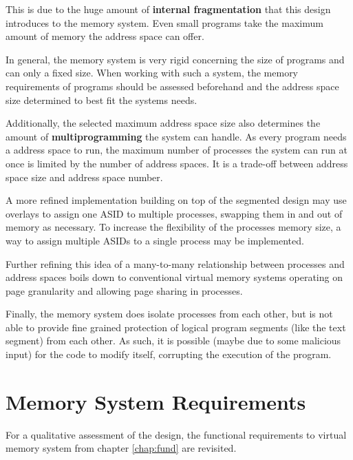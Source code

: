This is due to the huge amount of \textbf{internal fragmentation} that this design introduces to the memory system. Even small programs take the maximum amount of memory the address space can offer.

In general, the memory system is very rigid concerning the size of programs and can only a fixed size. When working with such a system, the memory requirements of programs should be assessed beforehand and the address space size determined to best fit the systems needs.

Additionally, the selected maximum address space size also determines the amount of \textbf{multiprogramming} the system can handle. As every program needs a address space to run, the maximum number of processes the system can run at once is limited by the number of address spaces.
It is a trade-off between address space size and address space number.

A more refined implementation building on top of the segmented design may use overlays \cite{tanenbaumOS} to assign one ASID to multiple processes, swapping them in and out of memory as necessary. To increase the flexibility of the processes memory size, a way to assign multiple ASIDs to a single process may be implemented.

Further refining this idea of a many-to-many relationship between processes and address spaces boils down to conventional virtual memory systems operating on page granularity and allowing page sharing in processes.

Finally, the memory system does isolate processes from each other, but is not able to provide fine grained protection of logical program segments (like the text segment) from each other. As such, it is possible (maybe due to some malicious input) for the code to modify itself, corrupting the execution of the program.

\section{Memory System Requirements}
For a qualitative assessment of the design, the functional requirements to virtual memory system from chapter \ref{chap:fund} are revisited.

